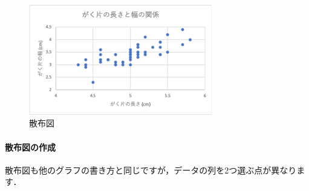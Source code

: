 \begin{figure}[htbp]
    \centering
    \includegraphics[width=8cm]{chap2/scatter.png}
    \caption{散布図}
    \label{fig:scatter}
\end{figure}

\paragraph{散布図の作成}

散布図も他のグラフの書き方と同じですが，データの列を2つ選ぶ点が異なります．

